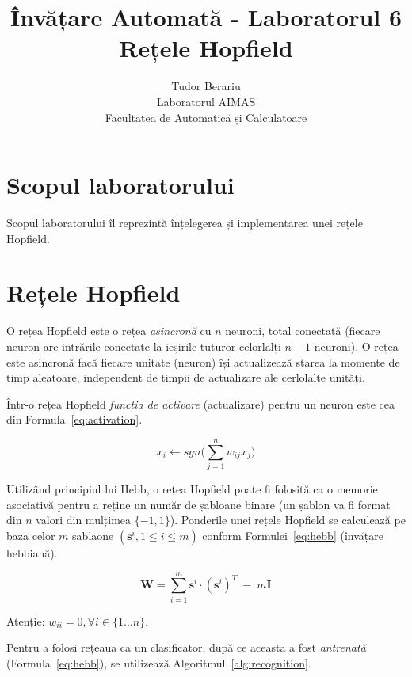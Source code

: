 \documentclass[12pt]{article}
\title{Învățare Automată - Laboratorul 6 \\ \textbf{Rețele Hopfield}}%
\author{Tudor Berariu \\ {\small Laboratorul AIMAS} \\ {\small
    Facultatea de Automatică și Calculatoare}}%
\begin{document}
\maketitle%

\section{Scopul laboratorului}
\label{sec:goals}

Scopul laboratorului îl reprezintă înțelegerea și implementarea unei
rețele Hopfield.

\section{Rețele Hopfield}
\label{sec:intro}

O rețea Hopfield este o rețea \emph{asincronă} cu $n$ neuroni, total
conectată (fiecare neuron are intrările conectate la ieșirile tuturor
celorlalți $n-1$ neuroni). O rețea este asincronă facă fiecare unitate
(neuron) își actualizează starea la momente de timp aleatoare,
independent de timpii de actualizare ale cerlolalte unități.

Într-o rețea Hopfield \emph{funcția de activare} (actualizare) pentru
un neuron este cea din Formula~\ref{eq:activation}.

\begin{equation}
  \label{eq:activation}
  x_i \longleftarrow sgn \Big( \displaystyle\sum_{j=1}^{n}w_{ij}x_j \Big)
\end{equation}

Utilizând principiul lui Hebb, o rețea Hopfield poate fi folosită ca o
memorie asociativă pentru a reține un număr de șabloane binare (un
șablon va fi format din $n$ valori din mulțimea $\lbrace -1, 1
\rbrace$). Ponderile unei rețele Hopfield se calculează pe baza celor
$m$ șablaone $(\mathbf{s}^i,1 \le i \le m)$ conform
Formulei~\ref{eq:hebb} (învățare hebbiană).

\begin{equation}
  \label{eq:hebb}
  \mathbf{W} = \displaystyle\sum_{i=1}^m \mathbf{s}^i \cdot (\mathbf{s}^i)^T
  \; - \; m\mathbf{I}
\end{equation}

Atenție: $w_{ii} = 0, \forall i \in \lbrace 1 \ldots n \rbrace$.

Pentru a folosi rețeaua ca un clasificator, după ce aceasta a fost
\emph{antrenată} (Formula~\ref{eq:hebb}), se utilizează
Algoritmul~\ref{alg:recognition}.
\end{document}
